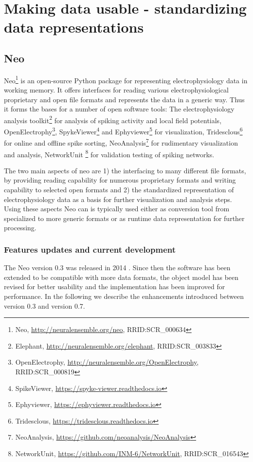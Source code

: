 \clearpage
\section{Making data usable - standardizing data representations}
\label{sec:Data}




\subsection{Neo}
Neo\footnote{Neo, \url{http://neuralensemble.org/neo}, RRID:SCR\_000634} \cite{neo09} is an open-source Python package for representing electrophysiology data in working memory. It offers interfaces for reading various electrophysiological proprietary and open file formats and represents the data in a generic way. Thus it forms the bases for a number of open software tools: The electrophysiology analysis toolkit\footnote{Elephant, \url{http://neuralensemble.org/elephant}, RRID:SCR\_003833} for analysis of spiking activity and local field potentials, OpenElectrophy\footnote{OpenElectrophy, \url{http://neuralensemble.org/OpenElectrophy}, RRID:SCR\_000819}, SpykeViewer\footnote{SpikeViewer, \url{https://spyke-viewer.readthedocs.io}} and Ephyviewer\footnote{Ephyviewer, \url{https://ephyviewer.readthedocs.io}} for visualization, Tridesclous\footnote{Tridesclous, \url{https://tridesclous.readthedocs.io}} for online and offline spike sorting, NeoAnalysis\footnote{NeoAnalysis, \url{https://github.com/neoanalysis/NeoAnalysis}} \cite{neoanalysis} for rudimentary visualization and analysis, NetworkUnit \footnote{NetworkUnit, \url{https://github.com/INM-6/NetworkUnit}, RRID:SCR\_016543} for validation testing of spiking networks.

The two main aspects of neo are 1) the interfacing to many different file formats, by providing reading capability for numerous proprietary formats and writing capability to selected open formats and 2) the standardized representation of electrophysiology data as a basis for further visualization and analysis steps. Using these aspects Neo can is typically used either as conversion tool from specialized to more generic formats or as runtime data representation for further processing.

\subsubsection{Features updates and current development}
The Neo version 0.3 was released in 2014 \cite{garcia_neo_2014}. Since then the software has been extended to be compatible with more data formats, the object model has been revised for better usability and the implementation has been improved for performance. In the following we describe the enhancements introduced between version 0.3 and version 0.7.


